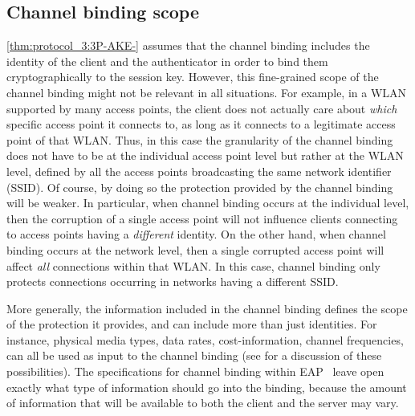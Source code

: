 \subsection{Channel binding scope}\label{sec:EAP:channel-binding_scope}
\cref{thm:protocol_3:3P-AKE-} assumes that the channel binding includes the identity of the client and the authenticator in order to bind them cryptographically to the session key.  
However,
this fine-grained scope of the channel binding might not be relevant in all situations.
For example,
in a WLAN supported by many access points,
the client does not actually care about \emph{which} specific access point it connects to,
as long as it connects to a legitimate access point of that WLAN.
Thus, in this case the granularity of the channel binding does not have to be at the individual access point level but rather at the WLAN level,
defined by all the access points broadcasting the same network identifier (SSID).  
Of course,
by doing so the protection  provided by the channel binding will be weaker. 
In particular,
when channel binding occurs at the individual level,
then the corruption of a single access point will not influence clients connecting to access points having a \emph{different} identity.
On the other hand, 
when channel binding occurs at the network level,
then a single corrupted access point will affect \emph{all} connections within that WLAN.
In this case,
channel binding only protects connections occurring in networks having a different SSID.


More generally,
the information included in the channel binding defines the scope of the protection it provides,
and can include more than just identities.
For instance,
physical media types,
data rates, cost-information,
channel frequencies,
can all be used as input to the channel binding
(see \cite{ClancyH:2009:making_the_case_EAP_cb} for a discussion of these possibilities). 
The specifications for channel binding within EAP~\cite{IETF:draft:EAP-channel-binding,IETF:RFC6677:EAP-channel-binding}
leave open exactly what type of information should go into the binding,
because the amount of information that will be available to both the client and the server may vary.





